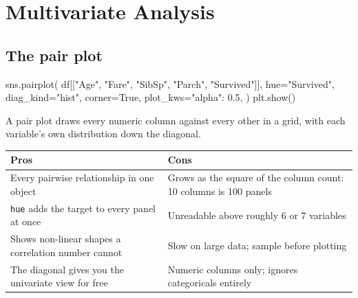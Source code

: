 \documentclass[11pt,a4paper]{article}
\begin{document}
\newpage
\section{Multivariate Analysis}



\subsection{The pair plot}

\begin{py}
sns.pairplot(
    df[["Age", "Fare", "SibSp", "Parch", "Survived"]],
    hue="Survived", diag_kind="hist", corner=True, plot_kws={"alpha": 0.5},
)
plt.show()
\end{py}

A pair plot draws every numeric column against every other in a grid, with each variable's
own distribution down the diagonal.

\begin{tabularx}{\textwidth}{@{}X X@{}}
\toprule
\rowcolor{tablehead} \textbf{Pros} & \textbf{Cons} \\
\midrule
Every pairwise relationship in one object & Grows as the square of the column count: 10 columns is 100 panels \\
\lstinline|hue| adds the target to every panel at once & Unreadable above roughly 6 or 7 variables \\
Shows non-linear shapes a correlation number cannot & Slow on large data; sample before plotting \\
The diagonal gives you the univariate view for free & Numeric columns only; ignores categoricals entirely \\
\bottomrule
\end{tabularx}


\end{document}
